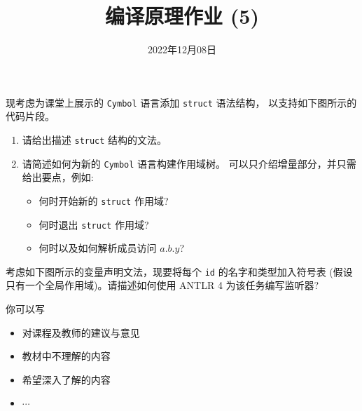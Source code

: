 \documentclass[a4paper, justified]{tufte-handout}
\title{编译原理作业 (5)}
\date{2022年12月08日}
\begin{document}
\maketitle
\noplagiarism %
\begin{abstract}
\end{abstract}
\beginrequired

\begin{problem}
  现考虑为课堂上展示的 \texttt{Cymbol} 语言添加 \texttt{struct} 语法结构，
  以支持如下图所示的代码片段。
  \begin{enumerate}[(1)]
    \item 请给出描述 \texttt{struct} 结构的文法。
    \item 请简述如何为新的 \texttt{Cymbol} 语言构建作用域树。
      可以只介绍增量部分，并只需给出要点，例如:
      \begin{itemize}
        \item 何时开始新的 \texttt{struct} 作用域?
        \item 何时退出 \texttt{struct} 作用域?
        \item 何时以及如何解析成员访问 $a.b.y$?
      \end{itemize}
  \end{enumerate}
\end{problem}

\begin{solution}
\end{solution}

\pagebreak
\begin{problem}
  考虑如下图所示的变量声明文法，现要将每个 \texttt{id} 的名字和类型加入符号表
  (假设只有一个全局作用域)。请描述如何使用 ANTLR 4 为该任务编写监听器?
\end{problem}

\begin{solution}
\end{solution}



\beginfb

你可以写
\begin{itemize}
  \item 对课程及教师的建议与意见
  \item 教材中不理解的内容
  \item 希望深入了解的内容
  \item $\cdots$
\end{itemize}
\end{document}
